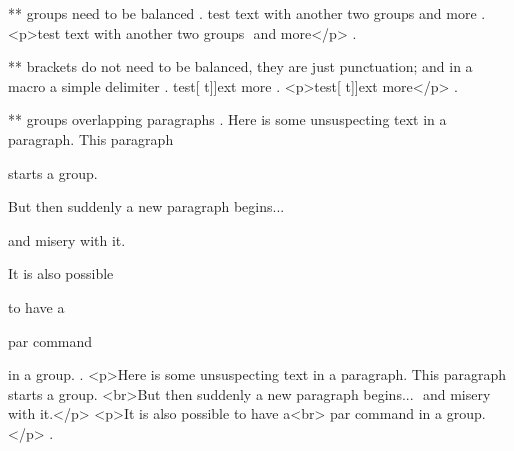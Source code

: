 ** groups need to be balanced
.
test {text with {{another }two} groups } and more
.
<p>test text with another two​ groups ​ and more</p>
.


** brackets do not need to be balanced, they are just punctuation; and in a macro a simple delimiter
.
test[ {t]]ext} more
.
<p>test[ t]]ext​ more</p>
.


** groups overlapping paragraphs
.
Here is some unsuspecting text in a paragraph. This paragraph { starts a group.

But then suddenly a new paragraph begins... } and misery with it.

It is also possible {to have a\par par command} in a group.
.
<p>Here is some unsuspecting text in a paragraph. This paragraph ​ starts a group.
<br>But then suddenly a new paragraph begins... ​ and misery with it.</p>
<p>It is also possible to have a<br> par command​ in a group.</p>
.
